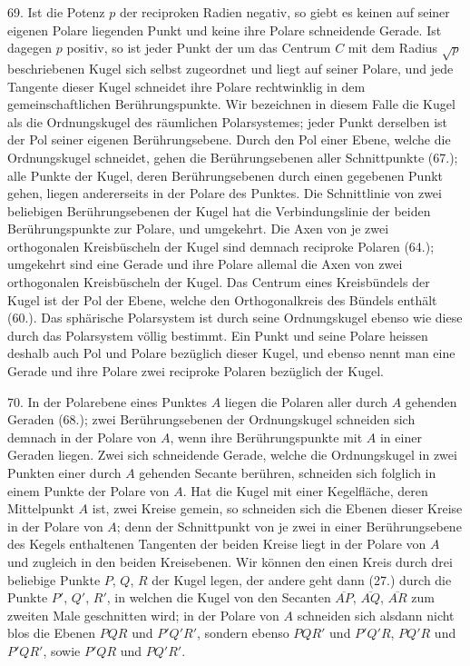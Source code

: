 69. Ist die Potenz $p$ der reciproken Radien negativ, so
giebt es keinen auf seiner eigenen Polare liegenden Punkt
und keine ihre Polare schneidende Gerade. Ist dagegen $p$
positiv, so ist jeder Punkt der um das Centrum $C$ mit dem
Radius $\sqrt{p}$ beschriebenen Kugel sich selbst zugeordnet und
liegt auf seiner Polare, und jede Tangente dieser Kugel
schneidet ihre Polare rechtwinklig in dem gemeinschaftlichen
Ber\"uhrungspunkte. Wir bezeichnen in diesem Falle die Kugel
als die {\glqq}Ordnungskugel{\grqq} des r\"aumlichen Polarsystemes;
jeder Punkt derselben ist der Pol seiner eigenen Ber\"uhrungsebene.
Durch den Pol einer Ebene, welche die Ordnungskugel
schneidet, gehen die Ber\"uhrungsebenen aller Schnittpunkte
(67.); alle Punkte der Kugel, deren Ber\"uhrungsebenen
durch einen gegebenen Punkt gehen, liegen andererseits %
in der Polare des Punktes. Die Schnittlinie von zwei beliebigen
Ber\"uhrungsebenen der Kugel hat die Verbindungslinie der
beiden Ber\"uh\-rungs\-punkte zur Polare, und umgekehrt. Die
Axen von je zwei orthogonalen Kreisb\"uscheln der Kugel sind
demnach reciproke Polaren (64.); umgekehrt sind eine Gerade
und ihre Polare allemal die Axen von zwei orthogonalen
Kreisb\"uscheln der Kugel. Das Centrum eines Kreisb\"undels
der Kugel ist der Pol der Ebene, welche den Orthogonalkreis
des B\"undels enth\"alt (60.). Das sph\"arische Polarsystem ist
durch seine Ordnungskugel ebenso wie diese durch das Polarsystem
v\"ollig bestimmt. Ein Punkt und seine Polare
heissen deshalb auch Pol und Polare {\glqq}bez\"uglich dieser Kugel{\grqq},
und ebenso nennt man eine Gerade und ihre Polare
zwei {\glqq}reciproke Polaren bez\"uglich der Kugel{\grqq}.

70. In der Polarebene eines Punktes $A$ liegen die Polaren
aller durch $A$ gehenden Geraden (68.); zwei Ber\"uhrungsebenen
der Ordnungskugel schneiden sich demnach in
der Polare von $A$, wenn ihre Ber\"uhrungspunkte mit $A$ in
einer Geraden liegen. Zwei sich schneidende Gerade, welche
die Ordnungskugel in zwei Punkten einer durch $A$ gehenden
Secante ber\"uhren, schneiden sich folglich in einem Punkte
der Polare von $A$. Hat die Kugel mit einer Kegelfl\"ache,
deren Mittelpunkt $A$ ist, zwei Kreise gemein, so schneiden
sich die Ebenen dieser Kreise in der Polare von $A$; denn der
Schnittpunkt von je zwei in einer Ber\"uhrungsebene des Kegels
enthaltenen Tangenten der beiden Kreise liegt in der
Polare von $A$ und zugleich in den beiden Kreisebenen. Wir
k\"onnen den einen Kreis durch drei beliebige Punkte $P$, $Q$, $R$
der Kugel legen, der andere geht dann (27.) durch die Punkte
$P'$, $Q'$, $R'$, in welchen die Kugel von den Secanten $\overline{AP}$, $\overline{AQ}$,
$\overline{AR}$ zum zweiten Male geschnitten wird; in der Polare von
$A$ schneiden sich alsdann nicht blos die Ebenen $PQR$ und
$P'Q'R'$, sondern ebenso $PQR'$ und $P'Q'R$, $PQ'R$ und $P'QR'$,
sowie $P'QR$ und $PQ'R'$.

